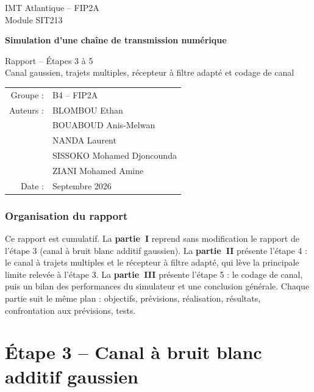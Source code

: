 \documentclass[11pt,a4paper]{article}
\begin{document}
\begin{titlepage}\centering
{\large IMT Atlantique -- FIP2A\\ Module SIT213\par}\vspace{3cm}
{\LARGE\bfseries Simulation d'une chaîne de transmission numérique\par}\vspace{0.6cm}
{\Large Rapport -- Étapes 3 à 5\\[4pt]\normalsize Canal gaussien, trajets multiples, récepteur à filtre adapté et codage de canal\par}\vspace{2.5cm}
\begin{tabular}{rl}
Groupe : & B4 -- FIP2A\\[4pt]
Auteurs : & BLOMBOU Ethan\\ & BOUABOUD Anis-Melwan\\ & NANDA Laurent\\ & SISSOKO Mohamed Djoncounda\\ & ZIANI Mohamed Amine\\[4pt]
Date : & Septembre 2026
\end{tabular}\vfill
\end{titlepage}
\tableofcontents\newpage

\section*{Organisation du rapport}
Ce rapport est cumulatif. La \textbf{partie~I} reprend sans modification le rapport de l'étape 3 (canal à bruit blanc additif gaussien). La \textbf{partie~II} présente l'étape 4 : le canal à trajets multiples et le récepteur à filtre adapté, qui lève la principale limite relevée à l'étape 3. La \textbf{partie~III} présente l'étape 5 : le codage de canal, puis un bilan des performances du simulateur et une conclusion générale. Chaque partie suit le même plan : objectifs, prévisions, réalisation, résultats, confrontation aux prévisions, tests.

\part{Étape 3 -- Canal à bruit blanc additif gaussien}
\end{document}
